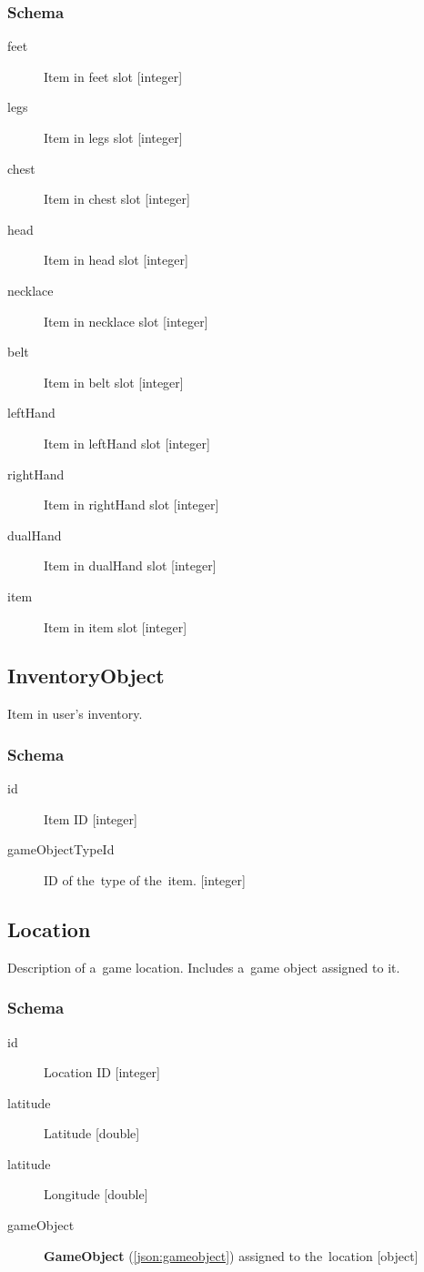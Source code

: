 		\subsubsection{Schema}
			\begin{description}
				\item[feet] Item in feet slot [integer]
				\item[legs] Item in legs slot [integer]
				\item[chest] Item in chest slot [integer]
				\item[head] Item in head slot [integer]
				\item[necklace] Item in necklace slot [integer]
				\item[belt] Item in belt slot [integer]
				\item[leftHand] Item in leftHand slot [integer]
				\item[rightHand] Item in rightHand slot [integer]
				\item[dualHand] Item in dualHand slot [integer]
				\item[item] Item in item slot [integer]			
			\end{description}

	\subsection{InventoryObject}
		\label{json:inventoryobject}	
		Item in user's inventory.
		\subsubsection{Schema}
			\begin{description}
				\item[id] Item ID [integer]
				\item[gameObjectTypeId] ID of the~type of the~item.	[integer]		
			\end{description}

	\subsection{Location}
		\label{json:location}	
		Description of a~game location. Includes a~game object assigned to it.
		\subsubsection{Schema}
			\begin{description}
				\item[id] Location ID [integer]
				\item[latitude] Latitude [double]
				\item[latitude] Longitude [double]
				\item[gameObject] \textbf{GameObject} (\ref{json:gameobject}) assigned to the~location [object]
			\end{description}	

